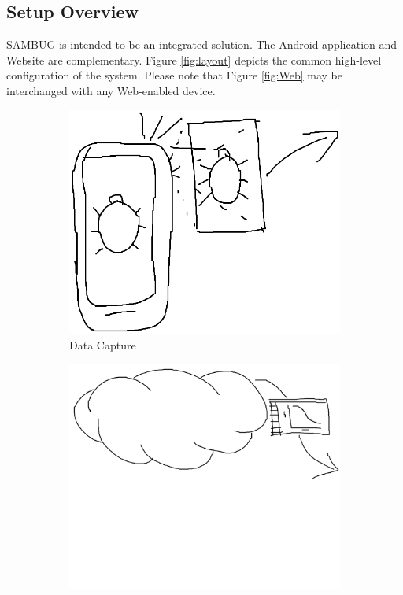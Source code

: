 \documentclass[11pt,a4paper,titlepage]{article}
\begin{document}
\subsection{Setup Overview}
SAMBUG is intended to be an integrated solution. The Android application and Website are complementary. Figure \ref{fig:layout} depicts the common high-level configuration of the system. Please note that Figure \ref{fig:Web} may be interchanged with any Web-enabled device.
	\begin{figure}[h]
		\begin{subfigure}{0.3\textwidth}
			\includegraphics[width=0.9\linewidth]{Fig1a}
		\caption{Data Capture}		
		\label{fig:dataCapt}	
		\end{subfigure}
		\begin{subfigure}{0.3\textwidth}
			\includegraphics[width=0.9\linewidth]{Fig1b}

\end{subfigure}
\end{figure}
\end{document}
